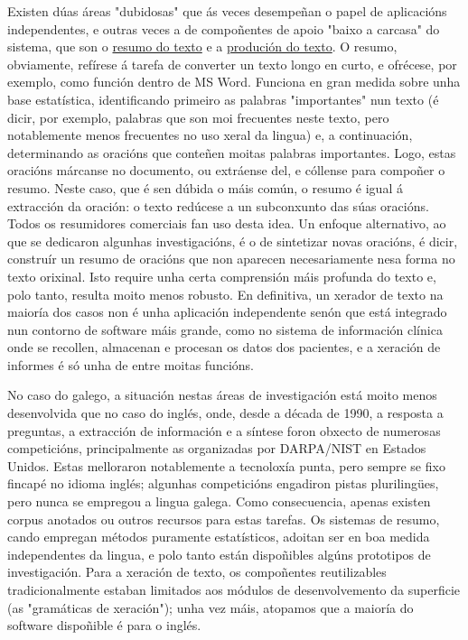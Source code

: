 \begin{multicols}{2}

Existen dúas áreas "dubidosas" que ás veces desempeñan o papel de aplicacións independentes, e outras veces a de compoñentes de apoio "baixo a carcasa" do sistema, que son o \uline{resumo do texto} e a \uline{produción do texto}. O resumo, obviamente, refírese á tarefa de converter un texto longo en curto, e ofrécese, por exemplo, como función dentro de MS Word. Funciona en gran medida sobre unha base estatística, identificando primeiro as palabras "importantes" nun texto (é dicir, por exemplo, palabras que son moi frecuentes neste texto, pero notablemente menos frecuentes no uso xeral da lingua) e, a continuación, determinando as oracións que conteñen moitas palabras importantes. Logo, estas oracións márcanse no documento, ou extráense del, e cóllense para compoñer o resumo. Neste caso, que é sen dúbida o máis común, o resumo é igual á extracción da oración: o texto redúcese a un subconxunto das súas oracións. Todos os resumidores comerciais fan uso desta idea. Un enfoque alternativo, ao que se dedicaron algunhas investigacións, é o de sintetizar novas oracións, é dicir, construír un resumo de oracións que non aparecen necesariamente nesa forma no texto orixinal. Isto require unha certa comprensión máis profunda do texto e, polo tanto, resulta moito menos robusto. En definitiva, un xerador de texto na maioría dos casos non é unha aplicación independente senón que está integrado nun contorno de software máis grande, como no sistema de información clínica onde se recollen, almacenan e procesan os datos dos pacientes, e a xeración de informes é só unha de entre moitas funcións.



No caso do galego, a situación nestas áreas de investigación está moito menos desenvolvida que no caso do inglés, onde, desde a década de 1990, a resposta a preguntas, a extracción de información e a síntese foron obxecto de numerosas competicións, principalmente as organizadas por DARPA/NIST en Estados Unidos. Estas melloraron notablemente a tecnoloxía punta, pero sempre se fixo fincapé no idioma inglés; algunhas competicións engadiron pistas plurilingües, pero nunca se empregou a lingua galega. Como consecuencia, apenas existen corpus anotados ou outros recursos para estas tarefas. Os sistemas de resumo, cando empregan métodos puramente estatísticos, adoitan ser en boa medida independentes da lingua, e polo tanto están dispoñibles algúns prototipos de investigación. Para a xeración de texto, os compoñentes reutilizables tradicionalmente estaban limitados aos módulos de desenvolvemento da superficie (as "gramáticas de xeración"); unha vez máis, atopamos que a maioría do software dispoñible é para o inglés. 


\end{multicols}
